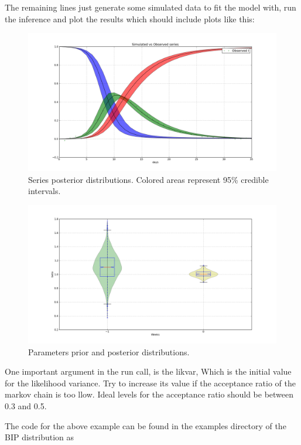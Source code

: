 \documentclass[a4paper,10pt,english]{sphinxmanual}
\begin{document}
The remaining lines just generate some simulated data to fit the model with, run the inference and plot the results which should include plots like this:
\begin{figure}[htbp]
\centering
\capstart

\includegraphics[width=15cm]{fit_series.png}
\caption{Series posterior distributions. Colored areas represent 95\% credible intervals.}\end{figure}
\begin{figure}[htbp]
\centering
\capstart

\includegraphics[width=15cm]{fit_par.png}
\caption{Parameters prior and posterior distributions.}\end{figure}

One important argument in the run call, is the likvar, Which is the initial value for the likelihood variance. Try to increase its value if the acceptance ratio of the markov chain is too llow. Ideal levels for the acceptance ratio should be between 0.3 and 0.5.

The code for the above example can be found in the examples directory of the BIP distribution as 
\end{document}
